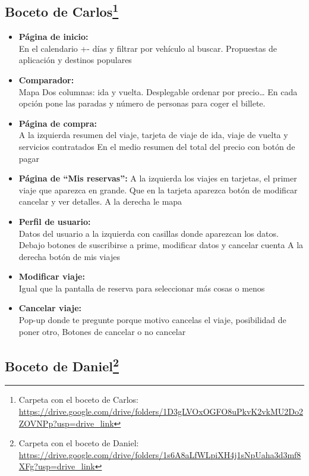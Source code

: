 \subsection[Boceto de Carlos]{Boceto de Carlos\footnote{Carpeta con el boceto de Carlos: \url{https://drive.google.com/drive/folders/1D3gLVOxOGFO8uPkvK2vkMU2Do2ZOVNPp?usp=drive_link}}}

\begin{itemize}
    \item\textbf{Página de inicio:} \\ En el calendario +- días y filtrar por vehículo al buscar.
    Propuestas de aplicación y destinos populares
    
    \item\textbf{Comparador:} \\ Mapa 
    Dos columnas: ida y vuelta.
    Desplegable ordenar por precio…
    En cada opción pone las paradas y número de personas para coger el billete.
    
    \item\textbf{Página de compra:} \\ A la izquierda resumen del viaje, tarjeta de viaje de ida, viaje de vuelta y servicios contratados
    En el medio resumen del total del precio con botón de pagar

    \item\textbf{Página de ``Mis reservas'':} A la izquierda los viajes en tarjetas, el primer viaje que aparezca en grande.
    Que en la tarjeta aparezca botón de modificar cancelar y ver detalles.
    A la derecha le mapa 
    
    \item\textbf{Perfil de usuario:} \\ Datos del usuario a la izquierda con casillas donde aparezcan los datos. 
    Debajo botones de suscribirse a prime, modificar datos y cancelar cuenta
    A la derecha botón de mis viajes

    \item\textbf{Modificar viaje:} \\ Igual que la pantalla de reserva para seleccionar más cosas o menos
    \item\textbf{Cancelar viaje:} \\ Pop-up donde te pregunte porque motivo cancelas el viaje, posibilidad de poner otro,
    Botones de cancelar o no cancelar
    
\end{itemize}
\subsection[Boceto de Daniel]{Boceto de Daniel\footnote{Carpeta con el boceto de Daniel: \url{https://drive.google.com/drive/folders/1s6A8aLfWLpiXH4j1sNpUaha3d3mf8XFg?usp=drive_link}}}

